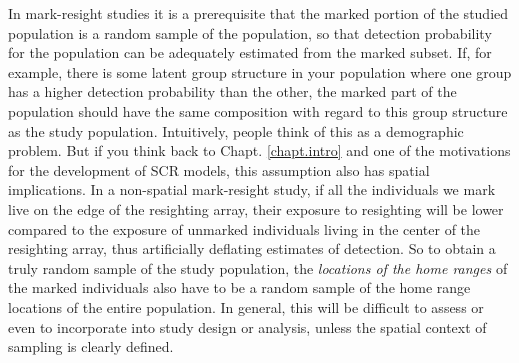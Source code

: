 In mark-resight studies it is a prerequisite that the marked portion of the studied population is a random sample of the %
population, so that detection probability for the population can be adequately estimated from the marked subset. If, for example, there is some latent group structure in your population where one group has a higher detection probability than the other, the marked part of the population should have the same composition with regard to this group structure as the study population. Intuitively, people think of this as a demographic problem. But if you think back to Chapt. \ref{chapt.intro} and one of the motivations for the development of SCR models, this assumption also has spatial implications. In a non-spatial mark-resight study, if all the individuals we mark live on the edge of the resighting array, their exposure to resighting will be lower compared to the exposure of unmarked individuals living in the center of the resighting array, thus artificially deflating estimates of detection. So to obtain a truly random sample of the study population, the \emph{locations of the home ranges} of the marked individuals also have to be a random sample of the home range locations of the entire population. %
In general, this %
will be difficult to assess or even to incorporate into study design or analysis, unless the spatial context of sampling is clearly defined.

